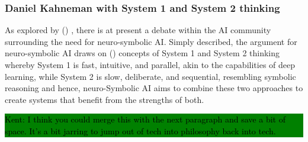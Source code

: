 \documentclass[hf]{ceurart}
\newcommand{\citeauthornum}[1]{\citeauthor{#1} (\citeyear{#1}) \cite{#1}}
\newcommand{\pinaforecomment}[4]{\colorbox{#1}{\textcolor{#4}{\parbox{.8\linewidth}{#2: #3}}}}
\newcommand{\osullikomment}[1]{\pinaforecomment{green}{Kent}{#1}{black}}
\begin{document}

\subsubsection{\textbf{Daniel Kahneman with System 1 and System 2 thinking}}
As explored by \citeauthornum{Garcez2023}, there is at present a debate within the AI community surrounding the need for neuro-symbolic AI. Simply described, the argument for neuro-symbolic AI draws on \citeauthornum{Kahneman2011} concepts of System 1 and System 2 thinking whereby System 1 is fast, intuitive, and parallel, akin to the capabilities of deep learning, while System 2 is slow, deliberate, and sequential, resembling symbolic reasoning and hence, neuro-Symbolic AI aims to combine these two approaches to create systems that benefit from the strengths of both. 
\osullikomment{I think you could merge this with the next paragraph and save a bit of space. It's a bit jarring to jump out of tech into philosophy back into tech. }
\end{document}
